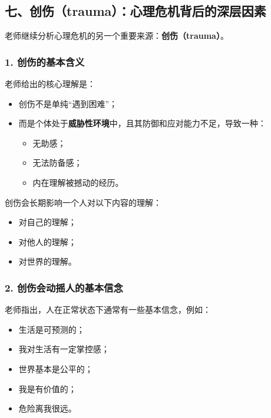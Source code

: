 \documentclass[
  chinese,
  9pt,
  a4paper,
]{ctexart}
\providecommand{\tightlist}{%
  \setlength{\itemsep}{0pt}\setlength{\parskip}{0pt}}
\begin{document}
\subsection{七、创伤（trauma）：心理危机背后的深层因素}\label{ux4e03ux521bux4f24traumaux5fc3ux7406ux5371ux673aux80ccux540eux7684ux6df1ux5c42ux56e0ux7d20}

老师继续分析心理危机的另一个重要来源：\textbf{创伤（trauma）}。

\subsubsection{1.
创伤的基本含义}\label{ux521bux4f24ux7684ux57faux672cux542bux4e49}

老师给出的核心理解是：

\begin{itemize}
\item
  创伤不是单纯``遇到困难''；
\item
  而是个体处于\textbf{威胁性环境}中，且其防御和应对能力不足，导致一种：

  \begin{itemize}
  \tightlist
  \item
    无助感；
  \item
    无法防备感；
  \item
    内在理解被撼动的经历。
  \end{itemize}
\end{itemize}

创伤会长期影响一个人对以下内容的理解：

\begin{itemize}
\tightlist
\item
  对自己的理解；
\item
  对他人的理解；
\item
  对世界的理解。
\end{itemize}

\subsubsection{2.
创伤会动摇人的基本信念}\label{ux521bux4f24ux4f1aux52a8ux6447ux4ebaux7684ux57faux672cux4fe1ux5ff5}

老师指出，人在正常状态下通常有一些基本信念，例如：

\begin{itemize}
\tightlist
\item
  生活是可预测的；
\item
  我对生活有一定掌控感；
\item
  世界基本是公平的；
\item
  我是有价值的；
\item
  危险离我很远。
\end{itemize}
\end{document}
